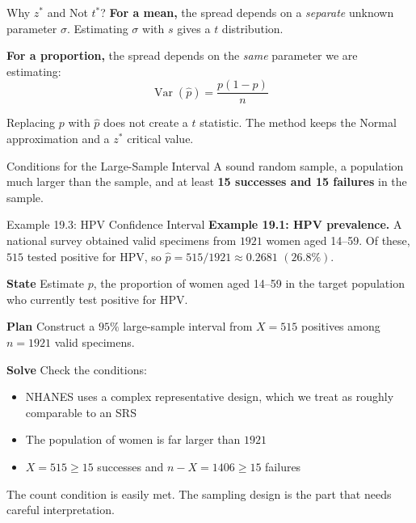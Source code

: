 \documentclass[aspectratio=169,10pt]{beamer}
\newcommand{\step}[1]{\textcolor{CourseBlue}{\textbf{#1}}\quad}
\begin{document}
\begin{frame}{Why $z^*$ and Not $t^*$?}
\textbf{For a mean,} the spread depends on a \emph{separate} unknown parameter $\sigma$. Estimating $\sigma$ with $s$ gives a $t$ distribution.

\vspace{0.3cm}
\textbf{For a proportion,} the spread depends on the \emph{same} parameter we are estimating:
\[
\operatorname{Var}(\hat{p})=\frac{p(1-p)}{n}
\]

\vspace{0.2cm}
Replacing $p$ with $\hat{p}$ does not create a $t$ statistic. The method keeps the Normal approximation and a $z^*$ critical value.

\vspace{0.3cm}
\begin{block}{Conditions for the Large-Sample Interval}
A sound random sample, a population much larger than the sample, and at least \textbf{15 successes and 15 failures} in the sample.
\end{block}
\end{frame}

\begin{frame}{Example 19.3: HPV Confidence Interval}
\textbf{Example 19.1: HPV prevalence.} A national survey obtained valid specimens from $1921$ women aged 14--59. Of these, $515$ tested positive for HPV, so $\hat{p}=515/1921\approx0.2681$ $(26.8\%)$.

\vspace{0.25cm}
\step{State} Estimate $p$, the proportion of women aged 14--59 in the target population who currently test positive for HPV.

\vspace{0.2cm}
\step{Plan} Construct a $95\%$ large-sample interval from $X=515$ positives among $n=1921$ valid specimens.

\vspace{0.2cm}
\step{Solve} Check the conditions:
\begin{itemize}
  \item NHANES uses a complex representative design, which we treat as roughly comparable to an SRS
  \item The population of women is far larger than $1921$
  \item $X=515\ge15$ successes and $n-X=1406\ge15$ failures
\end{itemize}

\vspace{0.2cm}
The count condition is easily met. The sampling design is the part that needs careful interpretation.
\end{frame}
\end{document}

